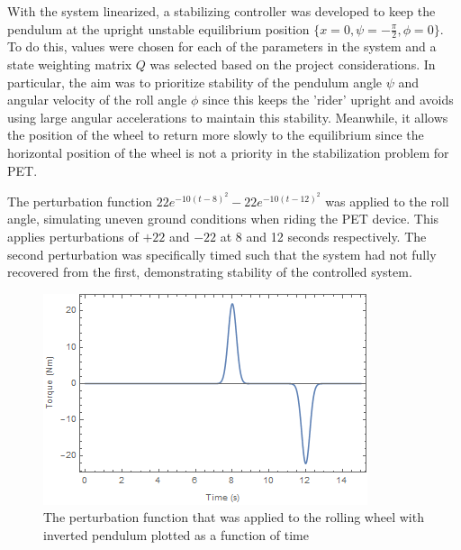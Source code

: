 With the system linearized, a stabilizing controller was developed to keep the pendulum at the upright unstable equilibrium position $\{x=0,\psi=-\frac{\pi}{2},\phi=0\}$. 
To do this, values were chosen for each of the parameters in the system and a state weighting matrix $Q$ was selected based on the project considerations. 
In particular, the aim was to prioritize stability of the pendulum angle $\psi$ and angular velocity of the roll angle $\phi$ since this keeps the 'rider' upright and avoids using large angular accelerations to maintain this stability. 
Meanwhile, it allows the position of the wheel to return more slowly to the equilibrium since the horizontal position of the wheel is not a priority in the stabilization problem for PET.

The perturbation function $22 e^{-10 (t-8)^2}-22 e^{-10 (t-12)^2}$ was applied to the roll angle, simulating uneven ground conditions when riding the PET device. 
This applies perturbations of $+22$ and $-22$ at 8 and 12 seconds respectively. The second perturbation was specifically timed such that the system had not fully recovered from the first, demonstrating stability of the controlled system.
\par

\begin{figure}[!htb]
	\centering
	\includegraphics[width=\linewidth]{perturbation.png}
	\endminipage\hspace{1em}%
	\caption{The perturbation function that was applied to the rolling wheel with inverted pendulum plotted as a function of time}\label{fig:perturb}
\end{figure}


